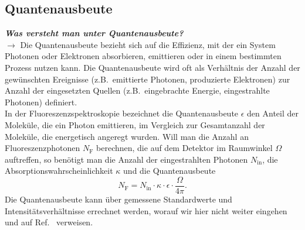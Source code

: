 \subsection{\label{subsec:FZV3}Quantenausbeute}
\textbf{\textit{Was versteht man unter Quantenausbeute?}} \\
$\rightarrow$
Die Quantenausbeute bezieht sich auf die Effizienz, mit der ein System Photonen oder Elektronen absorbieren, 
emittieren oder in einem bestimmten Prozess nutzen kann. 
Die Quantenausbeute wird oft als Verhältnis der Anzahl der gewünschten Ereignisse 
(z.B.~emittierte Photonen, produzierte Elektronen) zur Anzahl der eingesetzten Quellen 
(z.B.~eingebrachte Energie, eingestrahlte Photonen) definiert. \\
In der Fluoreszenzspektroskopie bezeichnet die Quantenausbeute $\epsilon$ den Anteil der Moleküle, 
die ein Photon emittieren, im Vergleich zur Gesamtanzahl der Moleküle, die energetisch angeregt wurden. 
Will man die Anzahl an Fluoreszenzphotonen $N_{\text{F}}$ berechnen, die auf dem Detektor im Raumwinkel $\Omega$ 
auftreffen, so benötigt man die Anzahl der eingestrahlten Photonen $N_{\text{in}}$, die 
Absorptionswahrscheinlichkeit $\kappa$ und die Quantenausbeute \cite{Demtroder}
\begin{equation}
    N_{\text{F}} = N_{\text{in}}\cdot \kappa \cdot \epsilon \cdot \frac{\Omega}{4\pi}.
\end{equation}
Die Quantenausbeute kann über gemessene Standardwerte und Intensitätsverhältnisse errechnet werden, 
worauf wir hier nicht weiter eingehen und auf Ref.~\cite{Prinzip} verweisen. \\